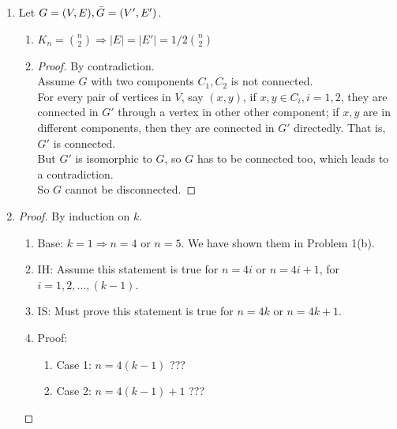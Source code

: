 \documentclass[a4paper]{article}
\begin{document}
\begin{enumerate}[label=\alph*)]
    \item Let $G=(V,E), \Bar{G}=(V',E')$.
        \begin{enumerate}[label=(\roman*)]
            \item $K_n=\binom{n}{2}\Rightarrow |E|=|E'|=1/2\binom{n}{2}$
            \item 
                \begin{proof} By contradiction.\\
                    Assume $G$ with two components $C_1,C_2$ is not connected.\\ For every pair of vertices in $V$, say $(x,y)$, if $x,y\in C_i, i=1,2$, they are connected in $G'$ through a vertex in other other component; if $x,y$ are in different components, then they are connected in $G'$ directedly. That is, $G'$ is connected.\\
                    But $G'$ is isomorphic to $G$, so $G$ has to be connected too, which leads to a contradiction.\\
                    So $G$ cannot be disconnected.
                \end{proof}
        \end{enumerate}
    \item
        \begin{proof} By induction on $k$.
            \begin{enumerate}
                \item Base: $k=1\Rightarrow n=4\text{ or }n=5$. We have shown them in Problem 1(b).
                \item IH: Assume this statement is true for $n=4i\text{ or }n=4i+1$, for $i=1,2,\ldots, (k-1)$.
                \item IS: Must prove this statement is true for $n = 4k$ or $n = 4k + 1$.
                \item Proof:
                    \begin{enumerate}
                        \item Case 1: $n=4(k-1)$ ???
                        \item Case 2: $n=4(k-1)+1$ ???
                    \end{enumerate}
            \end{enumerate}
        \end{proof}
\end{enumerate}
\end{document}
